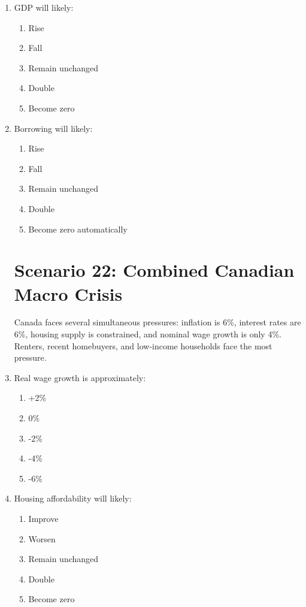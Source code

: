 \documentclass[12pt]{article}
\begin{document}
\begin{enumerate}[label=\textbf{\arabic*.}]
\item GDP will likely:
\begin{enumerate}[label=\Alph*.]
\item Rise
\item Fall
\item Remain unchanged
\item Double
\item Become zero
\end{enumerate}

\item Borrowing will likely:
\begin{enumerate}[label=\Alph*.]
\item Rise
\item Fall
\item Remain unchanged
\item Double
\item Become zero automatically
\end{enumerate}







\section*{Scenario 22: Combined Canadian Macro Crisis}

Canada faces several simultaneous pressures: inflation is 6\%, interest rates are 6\%, housing supply is constrained, and nominal wage growth is only 4\%. Renters, recent homebuyers, and low-income households face the most pressure.

\item Real wage growth is approximately:
\begin{enumerate}[label=\Alph*.]
\item +2\%
\item 0\%
\item -2\%
\item -4\%
\item -6\%
\end{enumerate}

\item Housing affordability will likely:
\begin{enumerate}[label=\Alph*.]
\item Improve
\item Worsen
\item Remain unchanged
\item Double
\item Become zero
\end{enumerate}


\end{enumerate}
\end{document}

